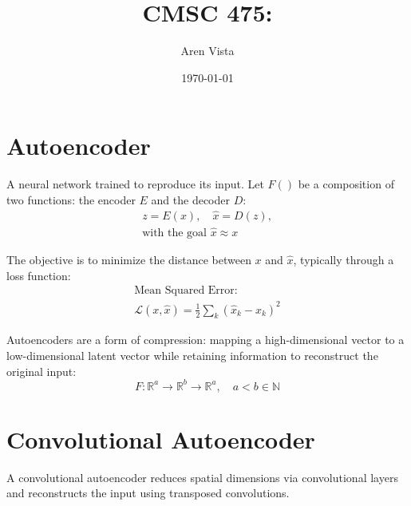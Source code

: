 \documentclass[11pt]{article}
\title{ CMSC 475: }
\author{ Aren Vista }
\date{\today}
\theoremstyle{plain}
\begin{document}
 \maketitle \pagebreak
\section{Autoencoder}

A neural network trained to reproduce its input. Let $F()$ be a composition of two functions: the encoder $E$ and the decoder $D$:
\[
	\begin{gathered}
		z = E(x), \quad \hat{x} = D(z), \\
		\text{with the goal } \hat{x} \approx x
	\end{gathered}
\]

The objective is to minimize the distance between $x$ and $\hat{x}$, typically through a loss function:
\[
	\begin{gathered}
		\text{Mean Squared Error:} \\
		\mathcal{L}(x, \hat{x}) = \frac{1}{2} \sum_k (\hat{x}_k - x_k)^2
	\end{gathered}
\]

Autoencoders are a form of compression: mapping a high-dimensional vector to a low-dimensional latent vector while retaining information to reconstruct the original input:
\[
	F: \mathbb{R}^a \rightarrow \mathbb{R}^b \rightarrow \mathbb{R}^a, \quad a < b \in \mathbb{N}
\]

\section{Convolutional Autoencoder}

A convolutional autoencoder reduces spatial dimensions via convolutional layers and reconstructs the input using transposed convolutions.
\end{document}
